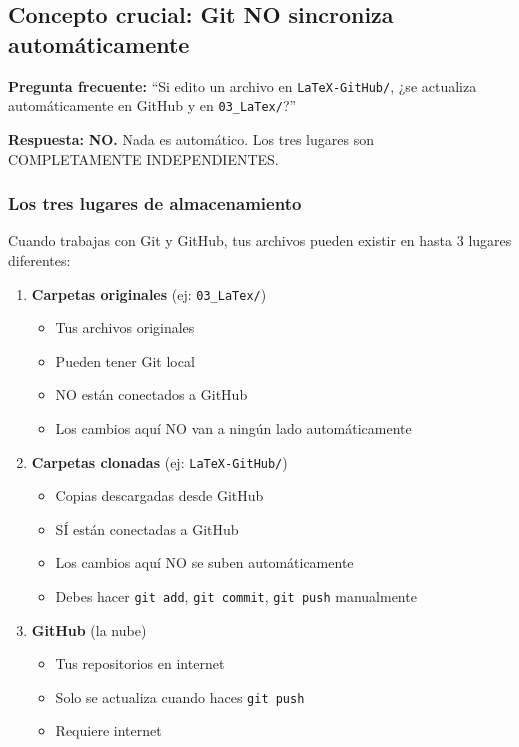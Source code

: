 \documentclass[12pt,a4paper]{article}
\begin{document}
\subsection{Concepto crucial: Git NO sincroniza automáticamente}

\begin{warningbox}
\textbf{Pregunta frecuente:} ``Si edito un archivo en \texttt{LaTeX-GitHub/}, ¿se actualiza automáticamente en GitHub y en \texttt{03\_LaTex/}?''

\textbf{Respuesta:} \textbf{NO.} Nada es automático. Los tres lugares son COMPLETAMENTE INDEPENDIENTES.
\end{warningbox}

\subsubsection{Los tres lugares de almacenamiento}

Cuando trabajas con Git y GitHub, tus archivos pueden existir en hasta 3 lugares diferentes:

\begin{enumerate}
  \item \textbf{Carpetas originales} (ej: \texttt{03\_LaTex/})
  \begin{itemize}
    \item Tus archivos originales
    \item Pueden tener Git local
    \item NO están conectados a GitHub
    \item Los cambios aquí NO van a ningún lado automáticamente
  \end{itemize}

  \item \textbf{Carpetas clonadas} (ej: \texttt{LaTeX-GitHub/})
  \begin{itemize}
    \item Copias descargadas desde GitHub
    \item SÍ están conectadas a GitHub
    \item Los cambios aquí NO se suben automáticamente
    \item Debes hacer \texttt{git add}, \texttt{git commit}, \texttt{git push} manualmente
  \end{itemize}

  \item \textbf{GitHub} (la nube)
  \begin{itemize}
    \item Tus repositorios en internet
    \item Solo se actualiza cuando haces \texttt{git push}
    \item Requiere internet
  \end{itemize}
\end{enumerate}
\end{document}
